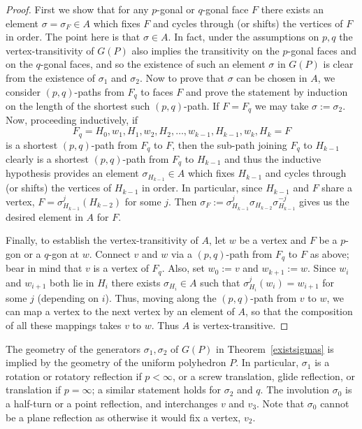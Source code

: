 \documentclass[12pt]{article}
\theoremstyle{definition}\newtheorem{definition}{Definition}[section]
\begin{document}
\begin{proof}
First we show that for any $p$-gonal or $q$-gonal face $F$ there exists an element $\sigma=\sigma_F\in A$ which fixes $F$ and cycles through (or shifts) the vertices of $F$ in order. The point here is that $\sigma\in A$. In fact, under the assumptions on $p,q$ the vertex-transitivity of $G(P)$ also implies the transitivity on the $p$-gonal faces and on the $q$-gonal faces, and so the existence of such an element $\sigma$ in $ G(P)$ is clear from the existence of $\sigma_1$ and $\sigma_2$. Now to prove that $\sigma$ can be chosen in $A$, we consider $(p,q)$-paths from $F_q$ to faces $F$ and prove the statement by induction on the length of the shortest such $(p,q)$-path. If $F=F_q$ we may take $\sigma:=\sigma_2$. Now, proceeding inductively, if $$F_q=H_0,w_1,H_1,w_2,H_2,\ldots,w_{k-1},H_{k-1},w_k,H_k = F$$ is a shortest $(p,q)$-path from $F_q$ to $F$, then the sub-path joining $F_q$ to $H_{k-1}$ clearly is a shortest $(p,q)$-path from $F_q$ to $H_{k-1}$ and thus the inductive hypothesis provides an element $\sigma_{H_{k-1}}\in A$ which fixes $H_{k-1}$ and cycles through (or shifts) the vertices of $H_{k-1}$ in order. In particular, since $H_{k-1}$ and $F$ share a vertex, $F=\sigma_{H_{k-1}}^j(H_{k-2})$ for some $j$. Then $\sigma_{F} := \sigma_{H_{k-1}}^{j} \sigma_{H_{k-2}}\sigma_{H_{k-1}}^{-j}$ gives us the desired element in $A$ for $F$.\smallskip

Finally, to establish the vertex-transitivity of $A$, let $w$ be a vertex and $F$ be a $p$-gon or a $q$-gon at $w$. Connect $v$ and $w$ via a $(p,q)$-path from $F_q$ to $F$ as above; bear in mind that $v$ is a vertex of $F_q$. Also, set $w_0:=v$ and $w_{k+1}:=w$. Since $w_i$ and $w_{i+1}$ both lie in $H_{i}$ there exists $\sigma_{H_{i}} \in A$ such that $\sigma_{H_{i}}^j(w_i) = w_{i+1}$ for some $j$ (depending on $i$). Thus, moving along the $(p,q)$-path from $v$ to $w$, we can map a vertex to the next vertex by an element of $A$, so that the composition of all these mappings takes $v$ to $w$. Thus $A$ is vertex-transitive. \smallskip
\end{proof}
\smallskip

The geometry of the generators $\sigma_1,\sigma_2$ of $G(P)$ in Theorem~\ref{existsigmas} is implied by the geometry of the uniform polyhedron $P$. In particular, $\sigma_1$ is a rotation or rotatory reflection if $p<\infty$, or a screw translation, glide reflection, or translation if $p=\infty$; a  similar statement holds for $\sigma_2$ and $q$. The involution $\sigma_0$ is a half-turn or a point reflection, and  interchanges $v$ and $v_3$. Note that $\sigma_0$ cannot be a plane reflection as otherwise it would fix a vertex, $v_2$. \smallskip
\end{document}
